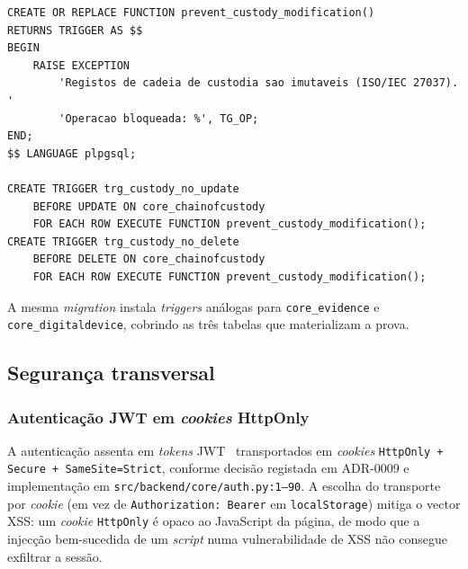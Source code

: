 \begin{lstlisting}[caption={\emph{Triggers} PostgreSQL em \texttt{core\_chainofcustody} (\emph{migration} \texttt{0002}).},label={lst:trigger}]
CREATE OR REPLACE FUNCTION prevent_custody_modification()
RETURNS TRIGGER AS $$
BEGIN
    RAISE EXCEPTION
        'Registos de cadeia de custodia sao imutaveis (ISO/IEC 27037). '
        'Operacao bloqueada: %', TG_OP;
END;
$$ LANGUAGE plpgsql;

CREATE TRIGGER trg_custody_no_update
    BEFORE UPDATE ON core_chainofcustody
    FOR EACH ROW EXECUTE FUNCTION prevent_custody_modification();
CREATE TRIGGER trg_custody_no_delete
    BEFORE DELETE ON core_chainofcustody
    FOR EACH ROW EXECUTE FUNCTION prevent_custody_modification();
\end{lstlisting}

A mesma \emph{migration} instala \emph{triggers} análogas para
\texttt{core\_evidence} e \texttt{core\_digitaldevice}, cobrindo as
três tabelas que materializam a prova.

\subsection{Segurança transversal}
\label{sec:security}

\subsubsection{Autenticação JWT em \emph{cookies} HttpOnly}
\label{sec:auth}

A autenticação assenta em \emph{tokens} JWT~\citep{simplejwt_docs}
transportados em \emph{cookies} \texttt{HttpOnly + Secure +
SameSite=Strict}, conforme decisão registada em ADR-0009 e
implementação em \texttt{src/backend/core/auth.py:1--90}. A escolha
do transporte por \emph{cookie} (em vez de \texttt{Authorization:
Bearer} em \texttt{localStorage}) mitiga o vector XSS: um
\emph{cookie} \texttt{HttpOnly} é opaco ao JavaScript da página, de
modo que a injecção bem-sucedida de um \emph{script} numa
vulnerabilidade de XSS não consegue exfiltrar a sessão.

